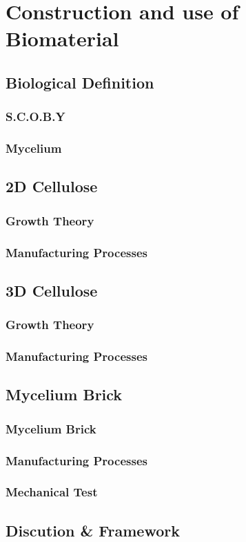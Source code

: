 \chapter{Construction and use of Biomaterial}


\section{Biological Definition}

\subsection{S.C.O.B.Y}
\subsection{Mycelium}

\section{2D Cellulose}

\subsection{Growth Theory}
\subsection{Manufacturing Processes}


\section{3D Cellulose}

\subsection{Growth Theory}
\subsection{Manufacturing Processes}



\section{Mycelium Brick}


\subsection{Mycelium Brick}
\subsection{Manufacturing Processes}
\subsection{Mechanical Test}



\section{Discution & Framework}
